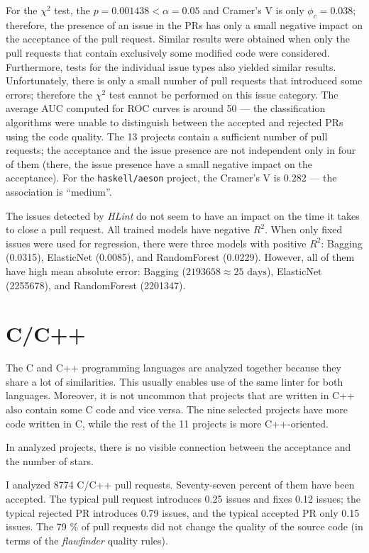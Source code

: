 \documentclass[digital,oneside,oldtable,nolof,nolot,nocover]{fithesis4}
\begin{document}
For the \(\chi^2\) test, the \(p = 0.001438 < \alpha = 0.05\) and Cramer's V is only \(\phi_c = 0.038\);
therefore, the presence of an issue in the PRs has only a small negative impact on the
acceptance of the pull request. Similar results were obtained when only
the pull requests that contain exclusively some modified code were considered.
Furthermore, tests for the individual issue types also yielded similar results.
Unfortunately, there is only a small number of pull requests that introduced some errors;
therefore the \(\chi^2\) test cannot be performed on this issue category.
The average AUC computed for ROC curves is around 50 --- the classification algorithms
were unable to distinguish between the accepted and rejected PRs using the code quality.
The 13 projects contain a sufficient number of pull requests; the acceptance and
the issue presence are not independent only in four of them (there, the issue presence
have a small negative impact on the acceptance). For the \texttt{haskell/aeson} project,
the Cramer's V is \(0.282\) --- the association is ``medium''.

The issues detected by \emph{HLint} do not seem to have an impact on the time it takes to close a pull request.
All trained models have negative \(R^2\). When only fixed issues were used for regression, there
were three models with positive \(R^2\): Bagging (0.0315), ElasticNet (0.0085), and RandomForest (0.0229).
However, all of them have high mean absolute error: Bagging (\(2193658 \approx 25\text{ days}\)),
ElasticNet (2255678), and RandomForest (2201347).
\section{C/C++}
\label{sec:org35fd253}
The C and C++ programming languages are analyzed together because they share
a lot of similarities.  This usually enables use of the same linter for both
languages. Moreover, it is not uncommon that projects that are written in C++
also contain some C code and vice versa.  The nine selected projects have more
code written in C, while the rest of the 11 projects is more C++-oriented.

In analyzed projects, there is no visible connection between the acceptance
and the number of stars.

I analyzed 8774 C/C++ pull requests. Seventy-seven percent of them have been accepted.
The typical pull request introduces 0.25 issues and fixes 0.12 issues; the typical
rejected PR introduces 0.79 issues, and the typical accepted PR only 0.15 issues.
The 79 \% of pull requests did not change the quality of the source code
(in terms of the \emph{flawfinder} quality rules).
\end{document}
